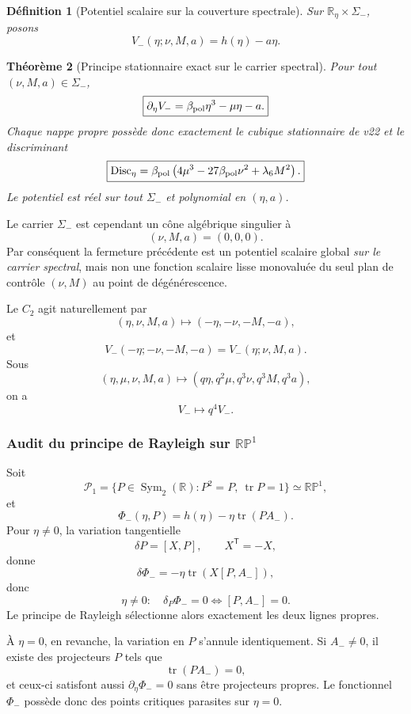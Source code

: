 \documentclass[11pt,a4paper]{article}
\newtheorem{theorem}{Théorème}[section]
\newtheorem{definition}[theorem]{Définition}
\begin{document}
\begin{definition}[Potentiel scalaire sur la couverture spectrale]\label{def:v23-spectral-potential-minus}
Sur $\mathbb R_\eta\times\Sigma_-$, posons
\begin{equation}\label{eq:v23-Vspect-minus}
 \boxed{
 V_-(\eta;\nu,M,a)
 =
 h(\eta)-a\eta.}
\end{equation}
\end{definition}

\begin{theorem}[Principe stationnaire exact sur le carrier spectral]\label{thm:v23-spectral-variational}
Pour tout $(\nu,M,a)\in\Sigma_-$,
\[
 \boxed{
 \partial_\eta V_-
 =
 \beta_{\rm pol}\eta^3-\mu\eta-a.}
\]
Chaque nappe propre possède donc exactement le cubique stationnaire de v22 et le discriminant
\[
 \boxed{
 \operatorname{Disc}_\eta
 =
 \beta_{\rm pol}
 \left(
 4\mu^3-27\beta_{\rm pol}\nu^2+\lambda_6M^2
 \right).}
\]
Le potentiel est réel sur tout $\Sigma_-$ et polynomial en $(\eta,a)$.
\end{theorem}

Le carrier $\Sigma_-$ est cependant un cône algébrique singulier à
\[
(\nu,M,a)=(0,0,0).
\]
Par conséquent la fermeture précédente est un potentiel scalaire global \emph{sur le carrier spectral}, mais non une fonction scalaire lisse monovaluée du seul plan de contrôle $(\nu,M)$ au point de dégénérescence.

Le $C_2$ agit naturellement par
\[
 (\eta,\nu,M,a)
 \longmapsto
 (-\eta,-\nu,-M,-a),
\]
et
\[
 \boxed{
 V_-(-\eta;-\nu,-M,-a)
 =
 V_-(\eta;\nu,M,a).}
\]
Sous
\[
 (\eta,\mu,\nu,M,a)
 \longmapsto
 (q\eta,q^2\mu,q^3\nu,q^3M,q^3a),
\]
on a
\[
 \boxed{V_-\longmapsto q^4V_-.}
\]

\subsubsection{Audit du principe de Rayleigh sur \texorpdfstring{$\mathbb{RP}^1$}{RP1}}

Soit
\[
 \mathscr P_1=
 \{P\in\operatorname{Sym}_2(\mathbb R):P^2=P,\ \operatorname{tr}P=1\}
 \simeq\mathbb{RP}^1,
\]
et
\[
 \Phi_-(\eta,P)=h(\eta)-\eta\operatorname{tr}(PA_-).
\]
Pour $\eta\neq0$, la variation tangentielle
\[
 \delta P=[X,P],\qquad X^{\mathsf T}=-X,
\]
donne
\[
 \delta\Phi_-
 =
 -\eta\operatorname{tr}(X[P,A_-]),
\]
donc
\[
 \boxed{
 \eta\neq0:
 \quad
 \delta_P\Phi_-=0
 \iff
 [P,A_-]=0.}
\]
Le principe de Rayleigh sélectionne alors exactement les deux lignes propres.

À $\eta=0$, en revanche, la variation en $P$ s'annule identiquement. Si $A_-\neq0$, il existe des projecteurs $P$ tels que
\[
 \operatorname{tr}(PA_-)=0,
\]
et ceux-ci satisfont aussi $\partial_\eta\Phi_-=0$ sans être projecteurs propres. Le fonctionnel $\Phi_-$ possède donc des points critiques parasites sur $\eta=0$.
\end{document}

